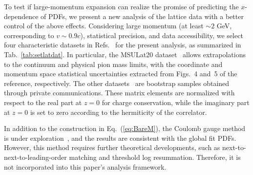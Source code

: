 \documentclass[prl,aps,twocolumn,preprintnumbers, showpacs, nofootinbib,superscriptaddress,notitlepage]{revtex4-1}
\begin{document}
To test if large-momentum expansion can realize the promise 
of predicting the $x$-dependence of PDFs,  we present a new analysis of the lattice data with a better control of the above effects. Considering large momentum (at least $\sim 2$ GeV, corresponding to $v\sim0.9 c$), statistical precision, and data accessibility, we select four characteristic datasets in Refs.~\cite{Lin:2020fsj,Alexandrou:2020qtt,LatticeParton:2018gjr,Chen:2024rgi} for the present analysis, as summarized in Tab.~\ref{tab:setlatdat}. In particular, the MSULat20 dataset~\cite{Lin:2020fsj} allows extrapolations to the continuum and physical pion mass limits, with the coordinate and momentum space statistical uncertainties extracted from Figs.~4 and~5 of the reference, respectively. The other datasets~\cite{Alexandrou:2020qtt,LatticeParton:2018gjr,Chen:2024rgi} are bootstrap samples obtained through private communications. These matrix elements are normalized with respect to the real part at $z=0$ for charge conservation, while the imaginary part at $z=0$ is set to zero according to the hermiticity of the correlator. 

In addition to the construction in Eq.~(\ref{eq:BareM}), the Coulomb gauge method is under exploration~\cite{Gao:2026hix}, and the results are consistent with the global fit PDFs. However, this method requires further theoretical developments, such as next-to-next-to-leading-order matching and threshold log resummation. Therefore, it is not incorporated into this paper's analysis framework. 

\end{document}
